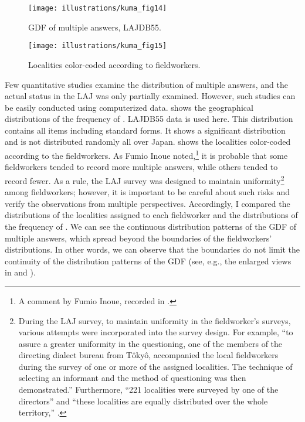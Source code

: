 \documentclass[output=paper]{LSP/langsci}
\begin{document}
\begin{figure}[t]
\texttt{[image: illustrations/kuma\_fig14]}
\caption{GDF of multiple answers, LAJDB55.}          
\label{fig:kuma:14}
\end{figure}

\begin{figure}
\texttt{[image: illustrations/kuma\_fig15]}
\caption{Localities color-coded according to fieldworkers.}  \label{fig:kuma:15}
\end{figure}

Few quantitative studies examine the distribution of multiple answers, and the actual status in the LAJ was only partially examined. However, such studies can be easily conducted using computerized data.  shows the geographical distributions of the frequency of . LAJDB55 data is used here. This distribution contains all items including standard forms. It shows a significant distribution and is not distributed randomly all over Japan.  shows the localities color-coded according to the fieldworkers. As Fumio Inoue noted,\footnote{ A comment by Fumio Inoue, recorded in \citet[6]{inagaki_hogen_1980}.} it is probable that some fieldworkers tended to record more multiple answers, while others tended to record fewer. As a rule, the LAJ survey was designed to maintain uniformity\footnote{ During the LAJ survey, to maintain uniformity in the fieldworker’s surveys, various attempts were incorporated into the survey design. For example, “to assure a greater uniformity in the questioning, one of the members of the directing dialect bureau from Tôkyô, accompanied the local fieldworkers during the survey of one or more of the assigned localities. The technique of selecting an informant and the method of questioning was then demonstrated.” Furthermore, “221 localities were surveyed by one of the directors” and “these localities are equally distributed over the whole territory,” \citep[23, 40--41]{kokuritsu_kokugo_kenkyujo_nlri_nihon_1966}.} among fieldworkers; however, it is important to be careful about such risks and verify the observations from multiple perspectives. Accordingly, I compared the distributions of the localities assigned to each fieldworker and the distributions of the frequency of . We can see the continuous distribution patterns of the GDF of multiple answers, which spread beyond the boundaries of the fieldworkers’ distributions. In other words, we can observe that the boundaries do not limit the continuity of the distribution patterns of the GDF (see, e.g., the enlarged views in  and ).
\end{document}
